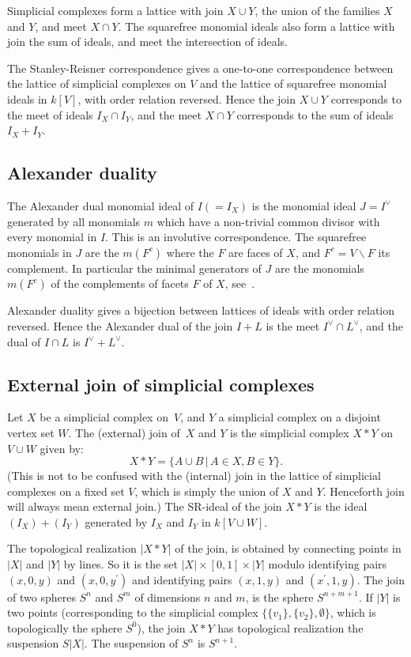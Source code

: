 Simplicial complexes form a lattice with join $X \cup Y$, the union
of the families $X$ and $Y$, and meet $X \cap Y$.
The squarefree monomial ideals also form a lattice
with join the sum of ideals, and meet the intersection of ideals.

The Stanley-Reisner correspondence gives
a one-to-one correspondence between the lattice of
simplicial complexes on $V$
and the lattice of squarefree monomial ideals in $k[V]$, with order relation
reversed. Hence the join $X \cup Y$ corresponds to the meet of ideals
$I_X \cap I_Y$, and the meet $X \cap Y$ corresponds to the sum of ideals
$I_X + I_Y$. 


\subsection{Alexander duality}
\label{subsec:AD}
The Alexander dual monomial ideal of $I (=I_X)$
is the monomial ideal $J = I^\vee$ generated
by all monomials $m$ which have a non-trivial common divisor with every monomial
in $I$. This is an involutive correspondence. The
squarefree monomials in $J$ are the $m(F^c)$ where the $F$ are faces
of $X$, and $F^c = V \backslash F$ its complement. In particular the
minimal generators
of $J$ are the monomials $m(F^c)$ of the complements of facets $F$
of $X$, see~\cite[Lemma 1.5.3]{HeHi}.

Alexander duality gives a bijection between lattices of ideals
with order relation reversed. Hence the Alexander dual of the join
$I + L$ is the meet $I^\vee \cap L^\vee$, and the dual of $I \cap L$ is
$I^\vee + L^\vee$.


\subsection{External join of simplicial complexes}

Let $X$ be a simplicial complex on~$V$, and $Y$ a simplicial complex
on a disjoint vertex set $W$. The (external) join of~$X$ and $Y$ is
the simplicial complex $X * Y$ on $V \cup W$ given by:
\[ X * Y = \{ A \cup B \, | \, A \in X, B \in Y \}. \]
(This is not to be confused with the (internal) join in the lattice
of simplicial
complexes on a fixed set $V$, which is simply the union of $X$ and $Y$.
Henceforth join will always mean external join.)
The SR-ideal of the join $X * Y$ is the ideal
$(I_X) + (I_Y)$ generated by $I_X$ and $I_Y$ in $k[V \cup W]$. 

The topological realization $|X * Y|$ of the join, is obtained by connecting
points
in $|X|$ and $|Y|$ by lines. So it is the set
$|X| \times [0,1] \times |Y|$ modulo identifying pairs
$(x,0,y)$ and $(x,0,y^\prime)$ and identifying pairs
$(x,1,y)$ and $(x^\prime, 1, y)$.
The join of two spheres $S^n$ and $S^{m}$ of dimensions $n$ and $m$,
is the sphere $S^{n+m+1}$. If $|Y|$ is two points (corresponding
to the simplicial complex $\{\{v_1\}, \{v_2\}, \emptyset\}$, which
is topologically the sphere $S^0$), the
join $X * Y$ has topological realization the suspension $S|X|$.
The suspension of $S^n$ is $S^{n+1}$.

